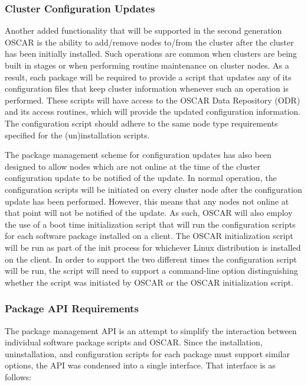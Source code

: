 \subsubsection{Cluster Configuration Updates}

Another added functionality that will be supported in the second
generation OSCAR is the ability to add/remove nodes to/from the
cluster after the cluster has been initially installed. Such
operations are common when clusters are being built in stages or when
performing routine maintenance on cluster nodes. As a result, each
package will be required to provide a script that updates any of its
configuration files that keep cluster information whenever such an
operation is performed. These scripts will have access to the OSCAR
Data Repository (ODR) and its access routines, which will provide the
updated configuration information. The configuration script should
adhere to the same node type requirements specified for the
(un)installation scripts.

The package management scheme for configuration updates has also been
designed to allow nodes which are not online at the time of the
cluster configuration update to be notified of the update. In normal
operation, the configuration scripts will be initiated on every
cluster node after the configuration update has been
performed. However, this means that any nodes not online at that point
will not be notified of the update. As such, OSCAR will also employ
the use of a boot time initialization script that will run the
configuration scripts for each software package installed on a
client. The OSCAR initialization script will be run as part of the
init process for whichever Linux distribution is installed on the
client. In order to support the two different times the configuration
script will be run, the script will need to support a command-line
option distinguishing whether the script was initiated by OSCAR or the
OSCAR initialization script.

\subsubsection{Package API Requirements}

The package management API is an attempt to simplify the interaction
between individual software package scripts and OSCAR.  Since the
installation, uninstallation, and configuration scripts for each
package must support similar options, the API was condensed into a
single interface. That interface is as follows:

